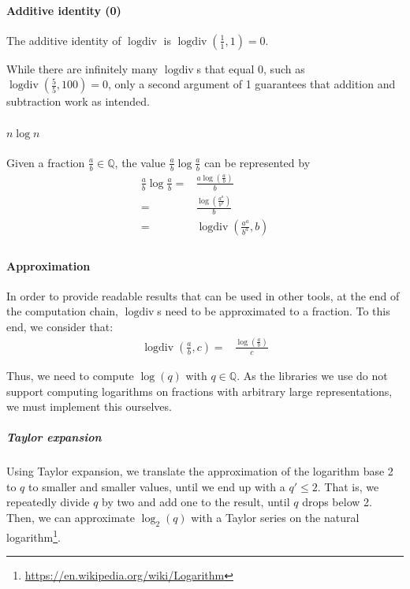 \documentclass{book}
\DeclareMathOperator{\logdiv}{logdiv}
\begin{document}
            \paragraph*{Additive identity (0)}
                The additive identity of $\logdiv$ is $\logdiv(\frac{1}{1}, 1) = 0$.
                
                While there are infinitely many $\logdiv$s that equal 0, such as $\logdiv(\frac{5}{5}, 100) = 0$, only a second argument of 1 guarantees that addition and subtraction work as intended.
                
            \paragraph*{$n \log n$}
                Given a fraction $\frac{a}{b} \in \mathbb{Q}$, the value $\frac{a}{b} \log \frac{a}{b}$ can be represented by
                \begin{align*}
                    \frac{a}{b} \log \frac{a}{b} ={} & 
                    \frac{a \log(\frac{a}{b})}{b}\\
                    {}={}& \frac{\log(\frac{a^a}{b^a})}{b}\\
                    {}={}& \logdiv(\frac{a^a}{b^a}, b)\\
                \end{align*}

            \paragraph*{Approximation}
                In order to provide readable results that can be used in other tools, at the end of the computation chain, $\logdiv$s need to be approximated to a fraction.
                To this end, we consider that:
                \begin{align*}
                    \logdiv(\frac{a}{b}, c) ={}& \frac{\log(\frac{a}{b})}{c}
                \end{align*}
    
                Thus, we need to compute $\log(q)$ with $q \in \mathbb{Q}$.
                As the libraries we use do not support computing logarithms on fractions with arbitrary large representations, we must implement this ourselves.

                \subparagraph{Taylor expansion}
                    Using Taylor expansion, we translate the approximation of the logarithm base 2 to $q$ to smaller and smaller values, until we end up with a $q' \leq 2$.
                    That is, we repeatedly divide $q$ by two and add one to the result, until $q$ drops below 2.
                    Then, we can approximate $\log_2(q)$ with a Taylor series on the natural logarithm\footnote{\url{https://en.wikipedia.org/wiki/Logarithm}}.
                    
\end{document}
